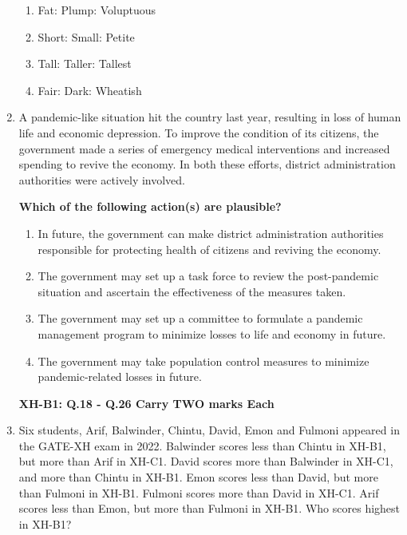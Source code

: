 \documentclass[journal,13pt,onecolumn]{exam}
\theoremstyle{remark}
\begin{document}
\begin{enumerate}[label=Q.\arabic*]
\begin{enumerate}[label=(\Alph*)]
    \item Fat: Plump: Voluptuous
    \item Short: Small: Petite
    \item Tall: Taller: Tallest
    \item Fair: Dark: Wheatish
\end{enumerate}

\item A pandemic-like situation hit the country last year, resulting in loss of human life and economic depression. To improve the condition of its citizens, the government made a series of emergency medical interventions and increased spending to revive the economy. In both these efforts, district administration authorities were actively involved.

\textbf{Which of the following action(s) are plausible?}

\begin{enumerate}
    \item In future, the government can make district administration authorities responsible for protecting health of citizens and reviving the economy.
    
    \item The government may set up a task force to review the post-pandemic situation and ascertain the effectiveness of the measures taken.
    
    \item The government may set up a committee to formulate a pandemic management program to minimize losses to life and economy in future.
    
    \item The government may take population control measures to minimize pandemic-related losses in future.
\end{enumerate}

\newpage
\textbf{XH-B1: Q.18 - Q.26 Carry TWO marks Each}\\

\item Six students, Arif, Balwinder, Chintu, David, Emon and Fulmoni appeared in the GATE-XH exam in 2022. Balwinder scores less than Chintu in XH-B1, but more than Arif in XH-C1. David scores more than Balwinder in XH-C1, and more than Chintu in XH-B1. Emon scores less than David, but more than Fulmoni in XH-B1. Fulmoni scores more than David in XH-C1. Arif scores less than Emon, but more than Fulmoni in XH-B1. Who scores highest in XH-B1?


\end{enumerate}
\end{document}
